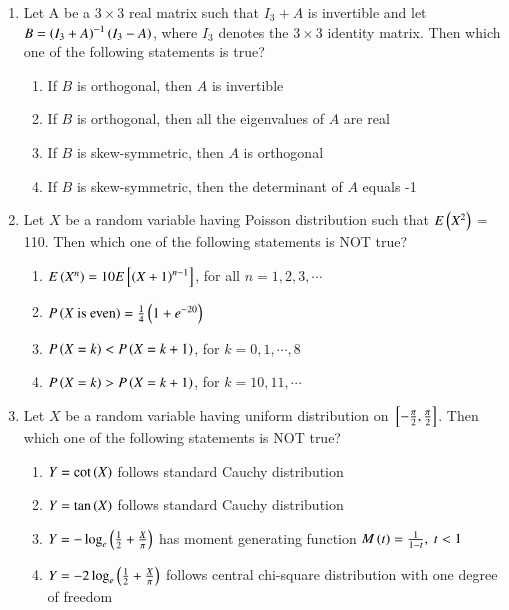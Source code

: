 \documentclass[journal]{IEEEtran}
\begin{document}
\begin{enumerate}
\item Let A be a $3 \times 3$ real matrix such that $I_3 + A$ is invertible and let $B = \left(I_3 + A\right)^{-1}\left(I_3 - A\right)$, where $I_3$ denotes the $3 \times 3$ identity matrix. Then which one of the following statements is true?
\begin{enumerate}
    \item If $B$ is orthogonal, then $A$ is invertible
    \item If $B$ is orthogonal, then all the eigenvalues of $A$ are real
    \item If $B$ is skew-symmetric, then $A$ is orthogonal
    \item If $B$ is skew-symmetric, then the determinant of $A$ equals -1 \\
\end{enumerate}
\item Let $X$ be a random variable having Poisson distribution such that $E\left(X^2\right)$ = 110. Then which one of the following statements is NOT true?
\begin{enumerate}
    \item $E\left(X^n\right) = 10 E{}\left[\left(X + 1\right)^{n-1}\right]$, for all $n = 1, 2, 3, \cdots$
    \item $P\left(X\text{ is even}\right) = \frac{1}{4}\left(1 + e^{-20}\right)$
    \item $P\left(X = k\right) < P\left(X = k + 1\right)$, for $k = 0, 1, \cdots, 8$
    \item $P\left(X = k\right) > P\left(X = k + 1\right)$, for $k = 10, 11, \cdots$ \\
\end{enumerate}
\item Let $X$ be a random variable having uniform distribution on ${}\left[-\frac{\pi}{2}, \frac{\pi}{2}\right]$. Then which one of the following statements is NOT true?
\begin{enumerate}
    \item $Y = \cot\left(X\right)$ follows standard Cauchy distribution
    \item $Y = \tan\left(X\right)$ follows standard Cauchy distribution
    \item $Y = -\log_e\left(\frac{1}{2} + \frac{X}{\pi}\right)$ has moment generating function $M\left(t\right) = \frac{1}{1 - t},\ t < 1$
    \item $Y = -2\log_e\left(\frac{1}{2} + \frac{X}{\pi}\right)$ follows central chi-square distribution with one degree of freedom \\
\end{enumerate}

\end{enumerate}
\end{document}

